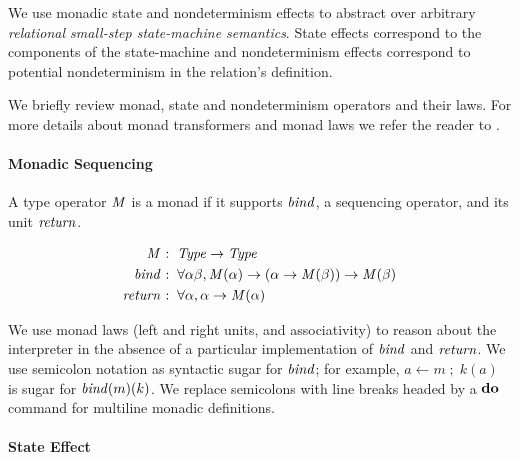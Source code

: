 \par

We use monadic state and nondeterminism effects to abstract over
arbitrary \emph{relational small-step state-machine semantics}. State
effects correspond to the components of the state-machine and
nondeterminism effects correspond to potential nondeterminism in the
relation's definition.

\par

We briefly review monad, state and nondeterminism operators and their
laws. For more details about monad transformers and monad laws we refer
the reader to \cite{dvanhorn:Liang1995Monad}.

\par

\paragraph{Monadic Sequencing}

A type operator $ \operatorname{\mathit{M}} $ is a monad if it supports $ \operatorname{\mathit{bind}} $,
a sequencing operator, and its unit $ \operatorname{\mathit{return}} $.

\small\begin{alignat*}{2}
 \operatorname{\mathit{M}}  &  \mathbin{\colon}   \operatorname{\mathit{Type}}   \rightarrow   \operatorname{\mathit{Type}}  \\
 \operatorname{\mathit{bind}}  &  \mathbin{\colon}   \forall   \alpha   \beta ,  \operatorname{\mathit{M}}(  \alpha )  \rightarrow  ( \alpha   \rightarrow   \operatorname{\mathit{M}}(  \beta ))  \rightarrow   \operatorname{\mathit{M}}(  \beta ) \\
 \operatorname{\mathit{return}}  &  \mathbin{\colon}   \forall   \alpha ,  \alpha   \rightarrow   \operatorname{\mathit{M}}(  \alpha )
\end{alignat*}\normalsize

We use monad laws (left and right units, and associativity) to reason
about the interpreter in the absence of a particular implementation of
$ \operatorname{\mathit{bind}} $ and $ \operatorname{\mathit{return}} $. We use semicolon notation as
syntactic sugar for $ \operatorname{\mathit{bind}} $; for example,
$a  \leftarrow  m  \;;\;  k(a)$ is sugar for $ \operatorname{\mathit{bind}}( m)(k)$. We
replace semicolons with line breaks headed by a $ \operatorname{\mathtt{\boldsymbol{\mathbf{do}}}} $ command
for multiline monadic definitions.

\par

\paragraph{State Effect}

